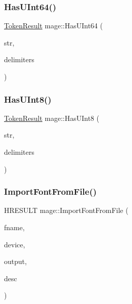 \hypertarget{namespacemage_a49b54d6a4244d71dc63237ead3a6307e}{}\label{namespacemage_a49b54d6a4244d71dc63237ead3a6307e} 
\subsubsection{\texorpdfstring{Has\+U\+Int64()}{HasUInt64()}}
{\footnotesize\ttfamily \hyperlink{namespacemage_a2178ba2411db5912f41b2e7698c2037d}{Token\+Result} mage\+::\+Has\+U\+Int64 (\begin{DoxyParamCaption}\item[{const char $\ast$}]{str,  }\item[{const char $\ast$}]{delimiters }\end{DoxyParamCaption})}

\hypertarget{namespacemage_ad4371436b14bc05f22abde780bf07be5}{}\label{namespacemage_ad4371436b14bc05f22abde780bf07be5} 
\subsubsection{\texorpdfstring{Has\+U\+Int8()}{HasUInt8()}}
{\footnotesize\ttfamily \hyperlink{namespacemage_a2178ba2411db5912f41b2e7698c2037d}{Token\+Result} mage\+::\+Has\+U\+Int8 (\begin{DoxyParamCaption}\item[{const char $\ast$}]{str,  }\item[{const char $\ast$}]{delimiters }\end{DoxyParamCaption})}

\hypertarget{namespacemage_afbf05d485686caef85c42be9625540b5}{}\label{namespacemage_afbf05d485686caef85c42be9625540b5} 
\subsubsection{\texorpdfstring{Import\+Font\+From\+File()}{ImportFontFromFile()}}
{\footnotesize\ttfamily H\+R\+E\+S\+U\+LT mage\+::\+Import\+Font\+From\+File (\begin{DoxyParamCaption}\item[{const wstring \&}]{fname,  }\item[{I\+D3\+D11\+Device2 $\ast$}]{device,  }\item[{\hyperlink{structmage_1_1_sprite_font_output}{Sprite\+Font\+Output} \&}]{output,  }\item[{const \hyperlink{structmage_1_1_sprite_font_descriptor}{Sprite\+Font\+Descriptor} \&}]{desc }\end{DoxyParamCaption})}

